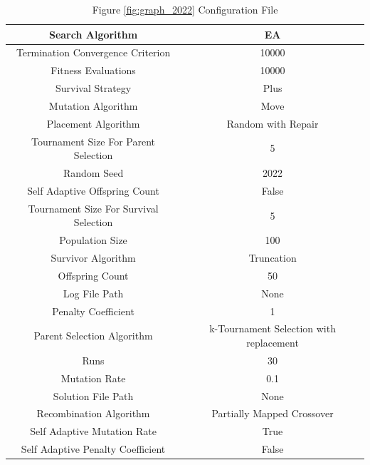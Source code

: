 \documentclass{standalone}
\begin{document}
\begin{table}[!htb]
	\centering
	\caption{Figure \ref{fig:graph_2022} Configuration File}
	\label{tab:graph_2022}
	\begin{tabular}{| c | c |}
		\hline
		Search Algorithm		& EA		 \\
		\hline
		Termination Convergence Criterion		& 10000		 \\
		\hline
		Fitness Evaluations		& 10000		 \\
		\hline
		Survival Strategy		& Plus		 \\
		\hline
		Mutation Algorithm		& Move		 \\
		\hline
		Placement Algorithm		& Random with Repair		 \\
		\hline
		Tournament Size For Parent Selection		& 5		 \\
		\hline
		Random Seed		& 2022		 \\
		\hline
		Self Adaptive Offspring Count		& False		 \\
		\hline
		Tournament Size For Survival Selection		& 5		 \\
		\hline
		Population Size		& 100		 \\
		\hline
		Survivor Algorithm		& Truncation		 \\
		\hline
		Offspring Count		& 50		 \\
		\hline
		Log File Path		& None		 \\
		\hline
		Penalty Coefficient		& 1		 \\
		\hline
		Parent Selection Algorithm		& k-Tournament Selection with replacement		 \\
		\hline
		Runs		& 30		 \\
		\hline
		Mutation Rate		& 0.1		 \\
		\hline
		Solution File Path		& None		 \\
		\hline
		Recombination Algorithm		& Partially Mapped Crossover		 \\
		\hline
		Self Adaptive Mutation Rate		& True		 \\
		\hline
		Self Adaptive Penalty Coefficient		& False		 \\
		\hline
	\end{tabular}
\end{table}
\end{document}
